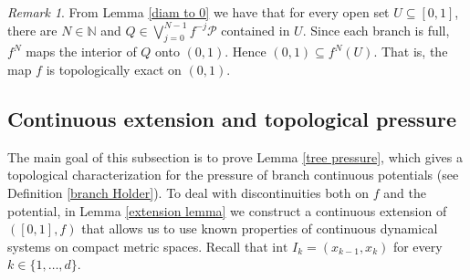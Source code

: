 \documentclass[12pt]{amsart}
\numberwithin{equation}{section} %
\numberwithin{figure}{section} %
\theoremstyle{plain}
\theoremstyle{definition}
\theoremstyle{remark}
\newtheorem{rema}[prop]{Remark}
\theoremstyle{citing}
\newcommand{\N}{\mathbb{N}}
\renewcommand{\=}{\coloneqq}
\begin{document}
    \begin{rema}\label{rema topologically exact}
        From Lemma \ref{diam to 0} we have that for every open set $U\subseteq [0,1]$, there are $N\in\N$ and $Q\in \bigvee_{{j=0}}^{N-1} f^{-j}\mathcal{P}$ contained in $U$. Since each branch is full, $f^N$ maps the interior of $Q$ onto $(0, 1)$. Hence $(0,1) \subseteq f^N(U)$. That is, the map $f$ is topologically exact on $(0,1)$.
    \end{rema}

\subsection{Continuous extension and topological pressure}\label{subseq: continuous extension}
The main goal of this subsection is to prove Lemma \ref{tree pressure}, which gives a topological characterization for the pressure of branch continuous potentials (see Definition \ref{branch Holder}). To deal with discontinuities both on $f$ and the potential, in Lemma \ref{extension lemma} we construct a continuous extension of $([0,1],f)$ that allows us to use known properties of continuous dynamical systems on compact metric spaces.
 Recall that $\text{int } I_k = (x_{k-1},x_k)$ for every $k\in\{1,\ldots,d\}$.
\end{document}
